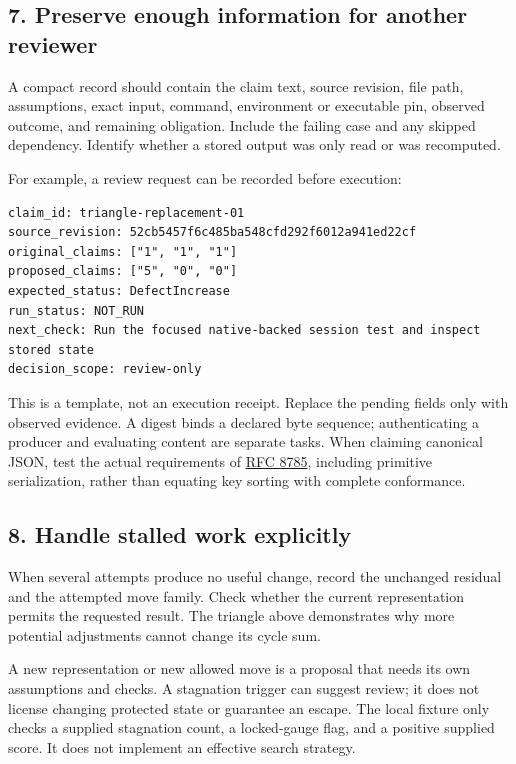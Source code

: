 \documentclass[
  11pt,
]{article}
\begin{document}
\subsection{7. Preserve enough information for another
reviewer}\label{preserve-enough-information-for-another-reviewer}

A compact record should contain the claim text, source revision, file
path, assumptions, exact input, command, environment or executable pin,
observed outcome, and remaining obligation. Include the failing case and
any skipped dependency. Identify whether a stored output was only read
or was recomputed.

For example, a review request can be recorded before execution:

\begin{lstlisting}
claim_id: triangle-replacement-01
source_revision: 52cb5457f6c485ba548cfd292f6012a941ed22cf
original_claims: ["1", "1", "1"]
proposed_claims: ["5", "0", "0"]
expected_status: DefectIncrease
run_status: NOT_RUN
next_check: Run the focused native-backed session test and inspect stored state
decision_scope: review-only
\end{lstlisting}

This is a template, not an execution receipt. Replace the pending fields
only with observed evidence. A digest binds a declared byte sequence;
authenticating a producer and evaluating content are separate tasks.
When claiming canonical JSON, test the actual requirements of
\href{https://www.rfc-editor.org/rfc/rfc8785}{RFC 8785}, including
primitive serialization, rather than equating key sorting with complete
conformance.

\subsection{8. Handle stalled work
explicitly}\label{handle-stalled-work-explicitly}

When several attempts produce no useful change, record the unchanged
residual and the attempted move family. Check whether the current
representation permits the requested result. The triangle above
demonstrates why more potential adjustments cannot change its cycle sum.

A new representation or new allowed move is a proposal that needs its
own assumptions and checks. A stagnation trigger can suggest review; it
does not license changing protected state or guarantee an escape. The
local fixture only checks a supplied stagnation count, a locked-gauge
flag, and a positive supplied score. It does not implement an effective
search strategy.
\end{document}
